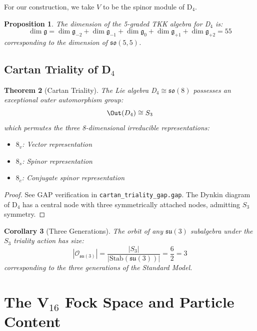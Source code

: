 \documentclass[12pt,a4paper]{article}
\newtheorem{theorem}{Theorem}[section]
\newtheorem{proposition}[theorem]{Proposition}
\newtheorem{corollary}[theorem]{Corollary}
\theoremstyle{definition}
\theoremstyle{axiom}
\newcommand{\g}{\mathfrak{g}}
\newcommand{\su}{\mathfrak{su}}
\newcommand{\so}{\mathfrak{so}}
\begin{document}
For our construction, we take $V$ to be the spinor module of D$_4$.

\begin{proposition}
The dimension of the 5-graded TKK algebra for D$_4$ is:
\begin{equation}
\dim \g = \dim \g_{-2} + \dim \g_{-1} + \dim \g_0 + \dim \g_{+1} + \dim \g_{+2} = 55
\end{equation}
corresponding to the dimension of $\so(5,5)$.
\end{proposition}

\subsection{Cartan Triality of D$_4$}

\begin{theorem}[Cartan Triality]\label{thm:triality}
The Lie algebra D$_4 \cong \so(8)$ possesses an exceptional outer automorphism group:
\begin{equation}
\Out(D_4) \cong S_3
\end{equation}
which permutes the three 8-dimensional irreducible representations:
\begin{itemize}
\item $8_v$: Vector representation
\item $8_s$: Spinor representation
\item $8_c$: Conjugate spinor representation
\end{itemize}
\end{theorem}

\begin{proof}
See GAP verification in \texttt{cartan\_triality\_gap.gap}. The Dynkin diagram of D$_4$ has a central node with three symmetrically attached nodes, admitting $S_3$ symmetry.
\end{proof}

\begin{corollary}[Three Generations]\label{cor:generations}
The orbit of any $\su(3)$ subalgebra under the $S_3$ triality action has size:
\begin{equation}
|\mathcal{O}_{\su(3)}| = \frac{|S_3|}{|\text{Stab}(\su(3))|} = \frac{6}{2} = 3
\end{equation}
corresponding to the three generations of the Standard Model.
\end{corollary}

\newpage

\section{The V$_{16}$ Fock Space and Particle Content}
\end{document}
